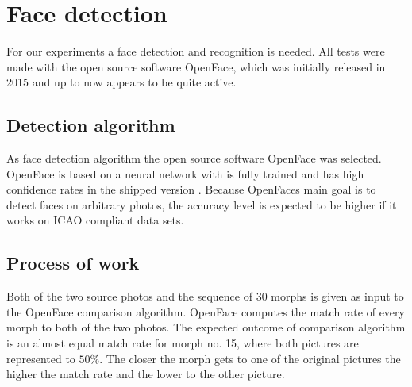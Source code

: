\section{Face detection}
For our experiments a face detection and recognition is needed. All tests were made with the open source software OpenFace, which was initially released in 2015 and up to now appears to be quite active\cite{amos2016openface}.

\subsection*{Detection algorithm} %
As face detection algorithm the open source software OpenFace was selected. OpenFace is based on a neural network with is fully trained and has high confidence rates in the shipped version \cite{baltruvsaitis2016openface}. Because OpenFaces main goal is to detect faces on arbitrary photos, the accuracy level is expected to be higher if it works on ICAO compliant data sets. 


\subsection*{Process of work}
Both of the two source photos and the sequence of 30 morphs is given as input to the OpenFace comparison algorithm. OpenFace computes the match rate of every morph to both of the two photos. 
The expected outcome of comparison algorithm is an almost equal match rate for morph no. 15, where both pictures are represented to $50\%$. The closer the morph gets to one of the original pictures the higher the match rate and the lower to the other picture. 

